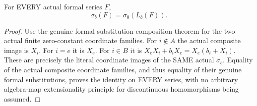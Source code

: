 \begin{theorem}
\label{hir:actual-formal-blowup-direction-shear-factorization}
For EVERY actual formal series $F$,
\[
 \sigma_b(F)=\sigma_0(L_b(F)).
\]
\leanok
\end{theorem}
\begin{proof}
Use the genuine formal substitution composition theorem for the two
actual finite zero-constant coordinate families. For $i\notin A$
the actual composite image is $X_i$. For $i=e$ it is $X_e$.
For $i\in B$ it is $X_eX_i+b_iX_e=X_e(b_i+X_i)$.
These are precisely the literal coordinate images of the SAME actual
$\sigma_b$. Equality of the actual composite coordinate families,
and thus equality of their genuine formal substitutions, proves the
identity on EVERY series, with no arbitrary algebra-map extensionality
principle for discontinuous homomorphisms being assumed.
\end{proof}

